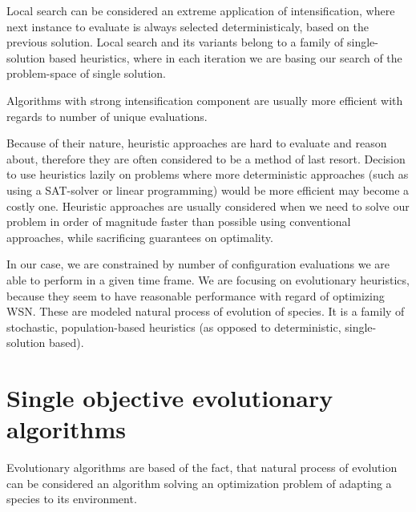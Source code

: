 \documentclass[12pt,oneside]{fithesis2}
\begin{document}
Local search can be considered an extreme application of intensification, where next instance to evaluate is always selected deterministicaly, based on the previous solution. Local search and its variants belong to a family of single-solution based heuristics, where in each iteration we are basing our search of the problem-space of single solution.

Algorithms with strong intensification component are usually more efficient with regards to number of unique evaluations.


Because of their nature, heuristic approaches are hard to evaluate and reason about, therefore they are often considered to be a method of last resort. Decision to use heuristics lazily on problems where more deterministic approaches (such as using a SAT-solver or linear programming) would be more efficient may become a costly one. Heuristic approaches are usually considered when we need to solve our problem in order of magnitude faster than possible using conventional approaches, while sacrificing guarantees on optimality.

In our case, we are constrained by number of configuration evaluations we are able to perform in a given time frame. 
We are focusing on evolutionary heuristics, because they seem to have reasonable performance with regard of optimizing WSN.\cite{stehl2013opt}
These are modeled natural process of evolution of species. It is a family of stochastic, population-based heuristics (as opposed to deterministic, single-solution based). 

\section{Single objective evolutionary algorithms}

Evolutionary algorithms are based of the fact, that natural process of evolution can be considered an algorithm solving an optimization problem of adapting a species to its environment. 
\end{document}
